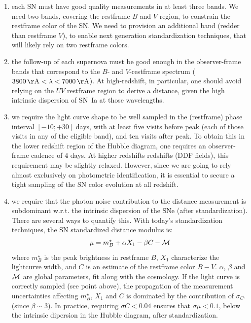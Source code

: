\documentclass [11pt,a4paper]{article}
\begin{document}
\begin{enumerate}

\item each SN must have good quality measurements in at least three
  bands. We need two bands, covering the restframe $B$ and $V$ region,
  to constrain the restframe color of the SN. We need to provision an
  additional band (redder than restframe $V$), to enable next
  generation standardization techniques, that will likely rely on two
  restframe colors.

\item the follow-up of each supernova must be good enough in the
  observer-frame bands that correspond to the $B$- and $V$-restframe
  spectrum ($3800 \angstrom < \lambda < 7000 \angstrom$).  At
  high-redshift, in particular, one should avoid relying on the $UV$
  restframe region to derive a distance, given the high intrinsic
  dispersion of SN~Ia at those wavelengths.
  
\item we require the light curve shape to be well sampled in the
  (restframe) phase interval $[-10;+30]$ days, with at least five
  visits before peak (each of those visits in any of the eligible
  band), and ten visits after peak.  To obtain this in the lower
  redshift region of the Hubble diagram, one requires an
  observer-frame cadence of 4 days.  At higher redshifts redshifts
  (DDF fields), this requirement may be slightly relaxed. However,
  since we are going to rely almost exclusively on photometric
  identification, it is essential to secure a tight sampling of the SN
  color evolution at all redshift.
  
\item we require that the photon noise contribution to the distance
  measurement is subdominant w.r.t. the intrinsic dispersion of the
  SNe (after standardization).  There are several ways to quantify
  this.  With today's standardization techniques, the SN standardized
  distance modulus is:
  \begin{equation}
    \mu = m^\star_B + \alpha X_1 - \beta C - \cal{M}
  \end{equation}
  where $m^\star_B$ is the peak brightness in restframe $B$, $X_1$
  characterize the lightcurve width, and $C$ is an estimate of the
  restframe color $B-V$. $\alpha$, $\beta$ and $\cal{M}$ are global
  parameters, fit along with the cosmology. If the light curve is
  correctly sampled (see point above), the propagation of the
  measurement uncertainties affecting $m^\star_B$, $X_1$ and $C$ is
  dominated by the contribution of $\sigma_C$. (since $\beta \sim
  3$). In practice, requiring $\sigma C < 0.04$ ensures that $\sigma
  \mu < 0.1$, below the intrinsic dipersion in the Hubble diagram,
  after standardization.
\end{enumerate}
\end{document}
